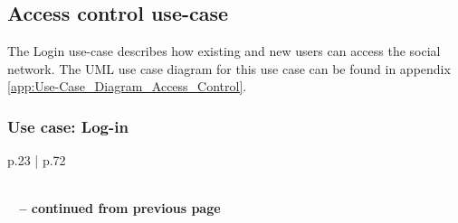 \documentclass[11pt,a4paper]{report}
\begin{document}
\subsection{Access control use-case}
The Login use-case describes how existing and new users can access the social network. The UML use case diagram for this use case can be found in appendix \vref{app:Use-Case_Diagram_Access_Control}.

\subsubsection{Use case: Log-in}

\begin{longtable}{p{} | p{}}
    \caption{Use case: Sign-in} \label{tab:ucLogIn} \\
    \endfirsthead
        {{\bfseries \tablename\ \thetable{} -- continued from previous page}} \\
         \\
    \endhead
         \\ 
    \endfoot
    \endlastfoot
    

\end{longtable}
\end{document}
